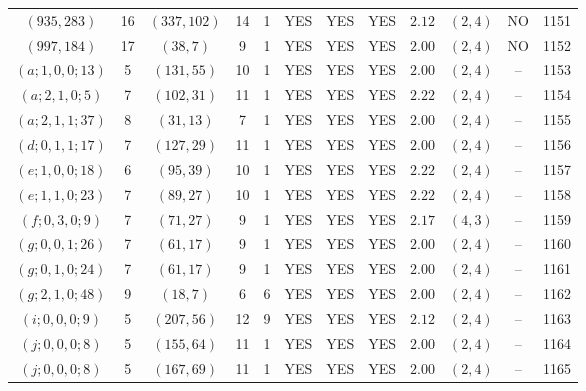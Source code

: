 \begin{longtable}{|c|c|c|c|c|c|c|c|c|c|c|c|}
$(935,283)$ & 16 & $(337,102)$ & 14 & 1 & YES & YES & YES & $2.12$ & $(2,4)$ & NO & 1151\\
$(997,184)$ & 17 & $(38,7)$ & 9 & 1 & YES & YES & YES & $2.00$ & $(2,4)$ & NO & 1152\\
$(a;1,0,0;13)$ & 5 & $(131,55)$ & 10 & 1 & YES & YES & YES & $2.00$ & $(2,4)$ & -- & 1153\\
$(a;2,1,0;5)$ & 7 & $(102,31)$ & 11 & 1 & YES & YES & YES & $2.22$ & $(2,4)$ & -- & 1154\\
$(a;2,1,1;37)$ & 8 & $(31,13)$ & 7 & 1 & YES & YES & YES & $2.00$ & $(2,4)$ & -- & 1155\\
$(d;0,1,1;17)$ & 7 & $(127,29)$ & 11 & 1 & YES & YES & YES & $2.00$ & $(2,4)$ & -- & 1156\\
$(e;1,0,0;18)$ & 6 & $(95,39)$ & 10 & 1 & YES & YES & YES & $2.22$ & $(2,4)$ & -- & 1157\\
$(e;1,1,0;23)$ & 7 & $(89,27)$ & 10 & 1 & YES & YES & YES & $2.22$ & $(2,4)$ & -- & 1158\\
$(f;0,3,0;9)$ & 7 & $(71,27)$ & 9 & 1 & YES & YES & YES & $2.17$ & $(4,3)$ & -- & 1159\\
$(g;0,0,1;26)$ & 7 & $(61,17)$ & 9 & 1 & YES & YES & YES & $2.00$ & $(2,4)$ & -- & 1160\\
$(g;0,1,0;24)$ & 7 & $(61,17)$ & 9 & 1 & YES & YES & YES & $2.00$ & $(2,4)$ & -- & 1161\\
$(g;2,1,0;48)$ & 9 & $(18,7)$ & 6 & 6 & YES & YES & YES & $2.00$ & $(2,4)$ & -- & 1162\\
$(i;0,0,0;9)$ & 5 & $(207,56)$ & 12 & 9 & YES & YES & YES & $2.12$ & $(2,4)$ & -- & 1163\\
$(j;0,0,0;8)$ & 5 & $(155,64)$ & 11 & 1 & YES & YES & YES & $2.00$ & $(2,4)$ & -- & 1164\\
$(j;0,0,0;8)$ & 5 & $(167,69)$ & 11 & 1 & YES & YES & YES & $2.00$ & $(2,4)$ & -- & 1165
\end{longtable}
